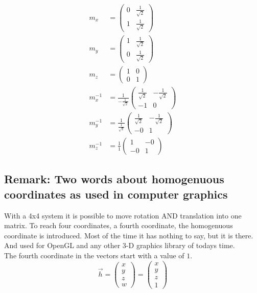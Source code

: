 \documentclass[a4paper]{article}
\begin{document}
\begin{displaymath}
\begin{align}
	m_x &= \begin{pmatrix}0 & \frac{1}{\sqrt2} \\ 1 & \frac{1}{\sqrt2} \end{pmatrix}\\
	m_y &= \begin{pmatrix}1 & \frac{1}{\sqrt2} \\ 0 & \frac{1}{\sqrt2} \end{pmatrix}\\
	m_z &= \begin{pmatrix}1 & 0\\ 0 & 1 \end{pmatrix}\\
	m^{-1}_x &= \frac{1}{-\frac{1}{\sqrt2}} \begin{pmatrix}\frac{1}{\sqrt2} & -\frac{1}{\sqrt2}\\ -1 & 0\end{pmatrix}\\
	m^{-1}_y &= \frac{1}{\frac{1}{\sqrt2}} \begin{pmatrix}\frac{1}{\sqrt2} & -\frac{1}{\sqrt2}\\ -0 & 1 \end{pmatrix}\\
	m^{-1}_z &= \frac{1}{1} \begin{pmatrix}1& -0\\ -0 & 1 \end{pmatrix}
\end{align}
\end{displaymath}


\subsection{Remark: Two words about homogenuous coordinates as used in computer graphics}
With a 4x4 system it is possible to move rotation AND translation into one matrix. To reach four coordinates,
a fourth coordinate, the homogenuous coordinate is introduced. Most of the time it has nothing to say, but it
is there. And used for OpenGL and any other 3-D graphics library of todays time.\\

The fourth coordinate in  the vectors start with a value of $1$.\\

\begin{displaymath}
\vec{h} = \begin{pmatrix}x\\y\\z\\w\end{pmatrix} = \begin{pmatrix}x\\y\\z\\1\end{pmatrix} 
\end{displaymath}
\end{document}
